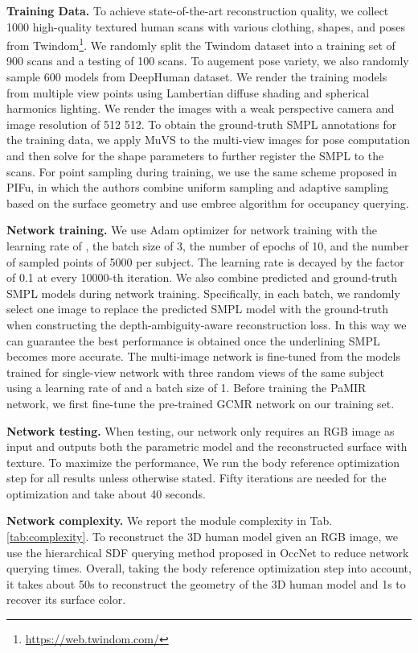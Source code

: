 \textbf{Training Data. } 
To achieve state-of-the-art reconstruction quality, we collect 1000 high-quality textured human scans with various clothing, shapes, and poses from Twindom\footnote{\url{https://web.twindom.com/}}. We randomly split the Twindom dataset into a training set of 900 scans and a testing of 100 scans. To augement pose variety, we also randomly sample 600 models from DeepHuman\cite{Zheng2019DeepHuman} dataset. 
We render the training models from multiple view points using Lambertian diffuse shading and spherical harmonics lighting\cite{SURREAL}. We render the images with a weak perspective camera and image resolution of 512  512. To obtain the ground-truth SMPL annotations for the training data, we apply MuVS\cite{huang2017muvs} to the multi-view images for pose computation and then solve for the shape parameters to further register the SMPL to the scans. For point sampling during training, we use the same scheme proposed in PIFu\cite{pifuSHNMKL19}, in which the authors combine uniform sampling and adaptive sampling based on the surface geometry and use embree algorithm\cite{wald2014embree} for occupancy querying. 

\textbf{Network training. } 
We use Adam optimizer for network training with the learning rate of , the batch size of 3, the number of epochs of 10, and the number of sampled points of 5000 per subject. The learning rate is decayed by the factor of 0.1 at every 10000-th iteration.
We also combine predicted and ground-truth SMPL models during network training. Specifically, in each batch, we randomly select one image to replace the predicted SMPL model with the ground-truth when constructing the depth-ambiguity-aware reconstruction loss. In this way we can guarantee the best performance is obtained once the underlining SMPL becomes more accurate. 
The multi-image network is fine-tuned from the models trained for single-view network with three random views of the same subject using a learning rate of  and a batch size of 1. Before training the PaMIR network, we first fine-tune the pre-trained GCMR network on our training set. 

\textbf{Network testing. } 
When testing, our network only requires an RGB image as input and outputs both the parametric model and the reconstructed surface with texture. To maximize the performance, We run the body reference optimization step for all results  unless otherwise stated. Fifty iterations are needed for the optimization and take about 40 seconds. 

\textbf{Network complexity. } 
We report the module complexity in Tab.\ref{tab:complexity}. To reconstruct the 3D human model given an RGB image, we use the hierarchical SDF querying method proposed in OccNet\cite{Mescheder2019OccupancyNetwork} to reduce network querying times. Overall, taking the body reference optimization step into account, it takes about 50s to reconstruct the geometry of the 3D human model and 1s to recover its surface color. 

